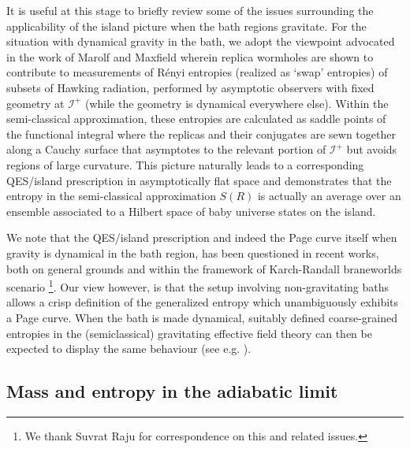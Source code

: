 \documentclass[12pt]{article}
\begin{document}
It is useful at this stage to briefly review some of the issues surrounding the applicability of the island picture when the bath regions gravitate. For the situation with dynamical gravity in the bath, we adopt the viewpoint advocated in the work of  Marolf  and Maxfield \cite{Marolf:2020rpm} wherein replica wormholes are shown to contribute to measurements of R\'enyi entropies (realized as `swap' entropies) of subsets of Hawking radiation, performed  by asymptotic observers with fixed geometry at $\mathscr{I}^+$ (while the geometry is dynamical everywhere else). Within the semi-classical approximation, these entropies are calculated as saddle points of the functional integral where the replicas and their conjugates are sewn together along a Cauchy surface that asymptotes to the relevant portion of $\mathscr I^+$ but avoids regions of large curvature. This picture naturally leads to a corresponding QES/island prescription in asymptotically flat space and demonstrates that the entropy in the semi-classical approximation $S(R)$ is actually an average over an ensemble associated to a Hilbert space of baby universe states on the island. 

We  note that  the QES/island prescription and indeed the Page curve itself when gravity is dynamical in the bath region, has been questioned in recent works, both on general grounds \cite{Raju:2020smc, Laddha:2020kvp} and within the framework of Karch-Randall braneworlds scenario \cite{Geng:2020fxl, Geng:2020qvw, Geng:2021hlu} \footnote{We thank Suvrat Raju for correspondence on this and related issues.}.  Our view however, is that the setup involving non-gravitating baths allows a crisp definition of the generalized entropy which unambiguously exhibits a Page curve. When the bath is made dynamical,  suitably defined  coarse-grained entropies in the (semiclassical) gravitating effective field theory can then be expected to display the same behaviour (see e.g. \cite{Ghosh:2021axl}).

\subsection{Mass and entropy in the adiabatic limit}
\end{document}
